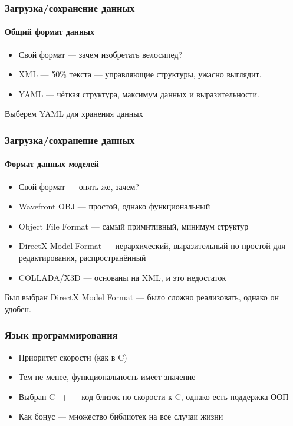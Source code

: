\documentclass{beamer}
\begin{document}
\begin{frame}
\frametitle{Загрузка/сохранение данных}
\framesubtitle{Общий формат данных}

\begin{itemize}
\item Свой формат --- зачем изобретать велосипед?
\item XML --- 50\% текста --- управляющие структуры, ужасно выглядит.
\item YAML --- чёткая структура, максимум данных и выразительности.
\end{itemize}
Выберем YAML для хранения данных
\end{frame}

\begin{frame}
\frametitle{Загрузка/сохранение данных}
\framesubtitle{Формат данных моделей}

\begin{itemize}
\item Свой формат --- опять же, зачем?
\item Wavefront OBJ --- простой, однако функциональный
\item Object File Format --- самый примитивный, минимум структур
\item DirectX Model Format --- иерархический, выразительный но простой для редактирования, распространённый
\item COLLADA/X3D --- основаны на XML, и это недостаток
\end{itemize}
Был выбран DirectX Model Format --- было сложно реализовать, однако он удобен.
\end{frame}

\begin{frame}
\frametitle{Язык программирования}

\begin{itemize}
\item Приоритет скорости (как в C)
\item Тем не менее, функциональность имеет значение
\item Выбран C++ --- код близок по скорости к C, однако есть поддержка ООП
\item Как бонус --- множество библиотек на все случаи жизни
\end{itemize}
\end{frame}
\end{document}
